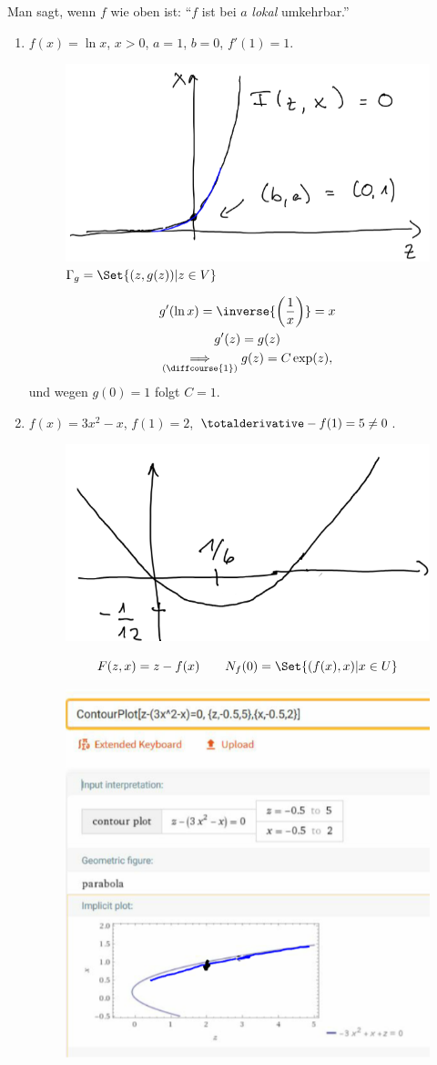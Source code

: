 Man sagt, wenn \( f \) wie oben ist: \enquote{\( f \) ist bei \( a \) \emph{lokal} umkehrbar.}
\begin{beispiele}
  \begin{enumerate}
    \item \( f(x)=\ln x \), \( x>0 \), \( a=1 \), \( b=0 \), \( f'(1)=1 \).
    \begin{figure}[H]
      \centering
      \includegraphics[width=0.5\linewidth]{figures/satz_von_der_umkehrungsfunktion_beispiel_ln}
      \caption*{\textcolor{Blue}{\( \Gamma_g=\Set{(z,g(z))|z\in V} \)}}
      \label{fig:satz_von_der_umkehrungsfunktion_beispiel_ln}
    \end{figure}
    \begin{gather*}
      g'(\ln x)=\inverse{\left( \frac{1}{x} \right)}=x\\
      g'(z)=g(z)\\
      \underset{(\text{\diffcourse{1}})}{\implies} g(z)=C\exp (z),
    \end{gather*}
    und wegen \( g(0)=1 \) folgt \( C=1 \).
    \item \( f(x)=3x^2-x \), \( f(1)=2 \), \( \totalderivative-{f}(1)=5\neq 0 \).
    \begin{figure}[H]
      \centering
      \includegraphics[width=0.5\linewidth]{figures/satz_von_der_umkehrungsfunktion_beispiel_parabel}
      \label{fig:satz_von_der_umkehrungsfunktion_beispiel_parabel}
    \end{figure}
    \begin{equation*}
      F(z,x)=z-f(x)\qquad N_f(0)=\Set{(f(x),x)|x\in U}
    \end{equation*}
    \begin{figure}[H]
      \centering
      \includegraphics[width=0.5\linewidth]{figures/satz_von_der_umkehrungsfunktion_beispiel_parabel_umkehrung}

\end{figure}
\end{enumerate}
\end{beispiele}
